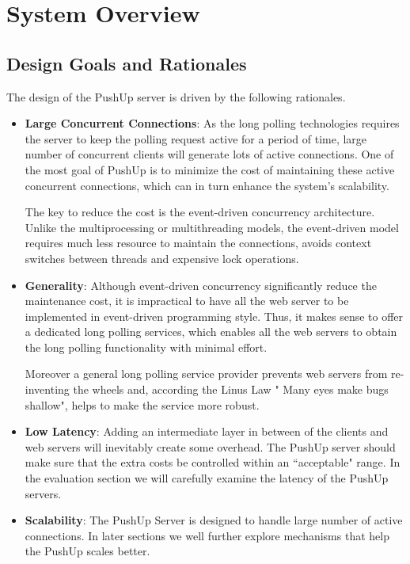 \section {System Overview\\}

\subsection{Design Goals and Rationales\\}
The design of the PushUp server is driven by the following rationales.
\begin{itemize}
\item {\bf Large Concurrent Connections}:
    As the long polling technologies requires the server to keep the polling
    request active for a period of time, large number of concurrent clients 
    will generate lots of active connections. One of the most goal of PushUp
    is to minimize the cost of maintaining these active concurrent connections,
    which can in turn enhance the system's scalability.
     
    The key to reduce the cost is the event-driven concurrency architecture.
    Unlike the multiprocessing or multithreading models, the event-driven model 
    requires much less resource to maintain the connections, avoids context
    switches between threads and expensive lock operations.

\item {\bf Generality}: 
    Although event-driven concurrency significantly 
    reduce the maintenance cost, it is impractical to have all the web 
    server to be implemented in event-driven programming style. Thus, it makes
    sense to offer a dedicated long polling services, which enables all the web
    servers to obtain the long polling functionality with minimal effort.

    Moreover a general long polling service provider prevents web servers from 
    re-inventing the wheels and, according the Linus Law\cite{Linus} "
    Many eyes make bugs shallow", helps to make the service more robust.
 
\item {\bf Low Latency}: Adding an intermediate layer in between of the 
    clients and web servers will inevitably create some overhead. 
    The PushUp server should make sure that the extra costs be controlled within
    an ``acceptable" range. In the evaluation section we will carefully examine
    the latency of the PushUp servers.

\item {\bf Scalability}: The PushUp Server is designed to handle large number
    of active connections. In later sections we well further explore 
    mechanisms that help the PushUp scales better.  

\end{itemize}

